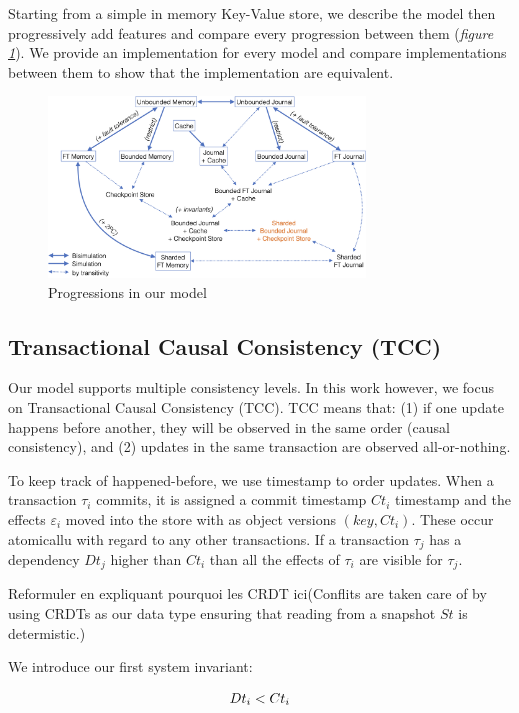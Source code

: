 \documentclass[systeme,french,english]{compas2022}
\begin{document}
Starting from a simple in memory Key-Value store, we describe the model then progressively add features and compare every progression between them (\emph{figure \ref{fig:transitions}}).
We provide an implementation for every model and compare implementations between them to show that the implementation are equivalent.

\begin{figure}[tp]
  \centering
  \includegraphics[width=0.75\textwidth]{figures/transitions.png}
  \caption{Progressions in our model}
  \label{fig:transitions}
\end{figure}

\subsection{Transactional Causal Consistency (TCC)}

Our model supports multiple consistency levels. In this work however, we focus on Transactional Causal Consistency (TCC).
TCC means that: (1) if one update happens before another, they will be observed in the same order (causal consistency), and (2) updates in the same transaction are observed all-or-nothing.

To keep track of happened-before, we use timestamp to order updates.
When a transaction $\tau_i$ commits, it is assigned a commit timestamp $Ct_i$ timestamp and the effects $\varepsilon_i$ moved into the store with as object versions $(key,Ct_i)$.
These occur atomicallu with regard to any other transactions.
If a transaction $\tau_j$ has a dependency $Dt_j$ higher than $Ct_i$ than all the effects of $\tau_i$ are visible for $\tau_j$.

Reformuler en expliquant pourquoi les CRDT ici(Conflits are taken care of by using CRDTs as our data type ensuring that reading from a snapshot $St$ is determistic.)

We introduce our first system invariant:

\[
  \begin{array}{lcl}
    \emph{$Dt_i < Ct_i$}
  \end{array} 
\]
\end{document}
